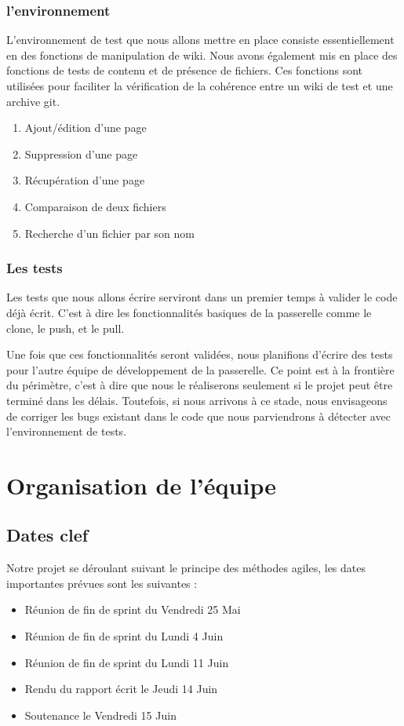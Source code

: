 \documentclass[11pt]{article}
\begin{document}
\subsubsection{l'environnement}
L'environnement de test que nous allons mettre en place consiste essentiellement en des fonctions de manipulation de wiki. Nous avons également mis en place des fonctions de tests de contenu et de présence de fichiers. Ces fonctions sont utilisées pour faciliter la vérification de la cohérence entre un wiki de test et une archive git.
\begin{enumerate}
\item Ajout/édition d'une page
\item Suppression d'une page
\item Récupération d'une page
\item Comparaison de deux fichiers
\item Recherche d'un fichier par son nom
\end{enumerate}
\subsubsection{Les tests}
Les tests que nous allons écrire serviront dans un premier temps à valider le code déjà écrit. C'est à dire les fonctionnalités basiques de la passerelle comme le clone, le push, et le pull.

Une fois que ces fonctionnalités seront validées, nous planifions d'écrire des tests pour l'autre équipe de développement de la passerelle. Ce point est à la frontière du périmètre, c'est à dire que nous le réaliserons seulement si le projet peut être terminé dans les délais. Toutefois, si nous arrivons à ce stade, nous envisageons de corriger les bugs existant dans le code que nous parviendrons à détecter avec l'environnement de tests.

\section{Organisation de l'équipe}
\subsection{Dates clef}
Notre projet se déroulant suivant le principe des méthodes agiles, les dates importantes prévues sont les suivantes :

\begin{itemize}
\item Réunion de fin de sprint du Vendredi 25 Mai
\item Réunion de fin de sprint du Lundi 4 Juin
\item Réunion de fin de sprint du Lundi 11 Juin
\item Rendu du rapport écrit le Jeudi 14 Juin
\item Soutenance le Vendredi 15 Juin
\end{itemize}
\end{document}
